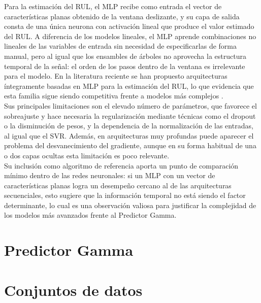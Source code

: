Para la estimación del RUL, el MLP recibe como entrada el vector de características planas obtenido de la ventana deslizante, y su capa de salida consta de una única neurona con activación lineal que produce el valor estimado del RUL. A diferencia de los modelos lineales, el MLP aprende combinaciones no lineales de las variables de entrada sin necesidad de especificarlas de forma manual, pero al igual que los ensambles de árboles no aprovecha la estructura temporal de la señal: el orden de los pasos dentro de la ventana es irrelevante para el modelo. En la literatura reciente se han propuesto arquitecturas íntegramente basadas en MLP para la estimación del RUL, lo que evidencia que esta familia sigue siendo competitiva frente a modelos más complejos \cite{rmixmlp2025}.\\[.15cm]

Sus principales limitaciones son el elevado número de parámetros, que favorece el sobreajuste y hace necesaria la regularización mediante técnicas como el dropout o la disminución de pesos, y la dependencia de la normalización de las entradas, al igual que el SVR. Además, en arquitecturas muy profundas puede aparecer el problema del desvanecimiento del gradiente, aunque en su forma habitual de una o dos capas ocultas esta limitación es poco relevante.\\[.15cm]

Su inclusión como algoritmo de referencia aporta un punto de comparación mínimo dentro de las redes neuronales: si un MLP con un vector de características planas logra un desempeño cercano al de las arquitecturas secuenciales, esto sugiere que la información temporal no está siendo el factor determinante, lo cual es una observación valiosa para justificar la complejidad de los modelos más avanzados frente al Predictor Gamma.

\section{Predictor Gamma}


\section{Conjuntos de datos}

